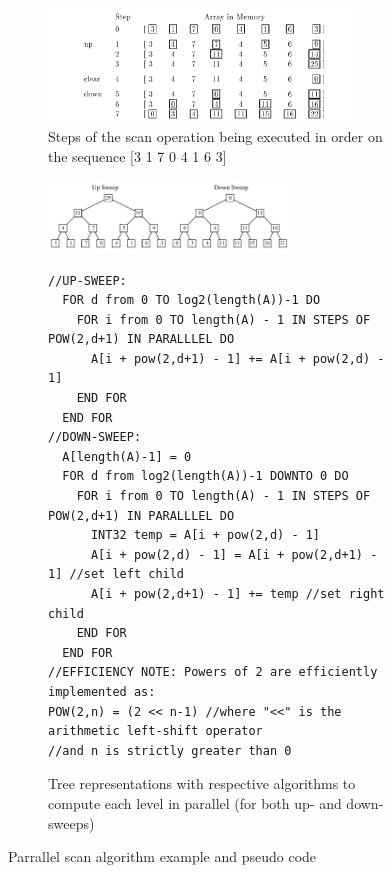   \begin{figure}[h!]
  \begin{mdframed}
    \centering
    \begin{subfigure}[b]{0.8\textwidth}
      \includegraphics[width=0.9\textwidth]{scanOperationOnArray.png}
      \caption{Steps of the scan operation being executed in order on the sequence [3 1 7 0 4 1 6 3]}
      \label{UPSWEEP_DOWNSWEEP}
    \end{subfigure}
    \begin{subfigure}[b]{\textwidth}
      \centering
      \includegraphics[width=0.7\textwidth]{upsweep_downsweep.png}
      \begin{minipage}{\textwidth}
        \begin{verbatim}
//UP-SWEEP:
  FOR d from 0 TO log2(length(A))-1 DO
    FOR i from 0 TO length(A) - 1 IN STEPS OF POW(2,d+1) IN PARALLLEL DO
      A[i + pow(2,d+1) - 1] += A[i + pow(2,d) - 1]
    END FOR
  END FOR
//DOWN-SWEEP:
  A[length(A)-1] = 0
  FOR d from log2(length(A))-1 DOWNTO 0 DO
    FOR i from 0 TO length(A) - 1 IN STEPS OF POW(2,d+1) IN PARALLLEL DO
      INT32 temp = A[i + pow(2,d) - 1]
      A[i + pow(2,d) - 1] = A[i + pow(2,d+1) - 1] //set left child
      A[i + pow(2,d+1) - 1] += temp //set right child
    END FOR
  END FOR
//EFFICIENCY NOTE: Powers of 2 are efficiently implemented as:
POW(2,n) = (2 << n-1) //where "<<" is the arithmetic left-shift operator
//and n is strictly greater than 0
        \end{verbatim}       
      \end{minipage}
      \caption{Tree representations with respective algorithms to compute each level in parallel (for both up- and down-sweeps)}
      \label{PARALLEL_SCAN_SUB_ALGORITHMS}
    \end{subfigure}
    \caption{Parrallel scan algorithm example and pseudo code \cite{blelloch1990prefix}}
    \label{PARALLEL_SCAN}
  \end{mdframed}
  \end{figure}
 
